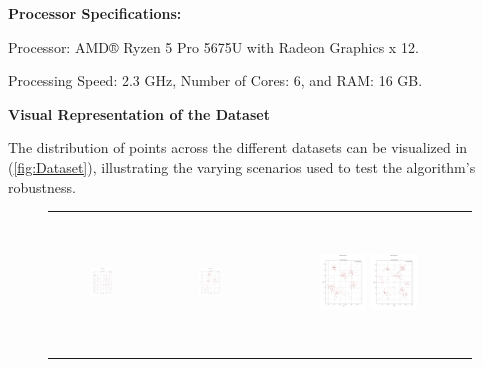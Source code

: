 \vspace{3mm}  

\textbf{Processor Specifications:}


Processor: AMD® Ryzen 5 Pro 5675U with Radeon Graphics x 12.


Processing Speed: 2.3 GHz, Number of Cores: 6, and RAM: 16 GB.


\vspace{3mm}  

\textbf{Visual Representation of the Dataset}

The distribution of points across the different datasets can be visualized in (\autoref{fig:Dataset}), illustrating the varying scenarios used to test the algorithm's robustness.


\begin{figure}[p]
    \centering
    \begin{tabular}{ccc}
         \includegraphics[height=36mm,width=0.24\textwidth]{Images/data/01.png}
        & \includegraphics[height=36mm,width=0.24\textwidth]{Images/data/02.png}
        & \includegraphics[height=36mm,width=0.24\textwidth]{Images/data/03.png}
         \includegraphics[height=36mm,width=0.24\textwidth]{Images/data/04.png}\\[-4pt]


\end{tabular}
\end{figure}
